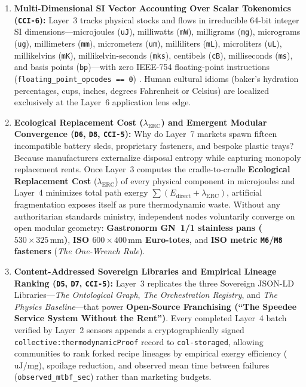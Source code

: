 \begin{enumerate}
    \item \textbf{Multi-Dimensional SI Vector Accounting Over Scalar Tokenomics (\texttt{CCI-6}):} Layer~3 tracks physical stocks and flows in irreducible 64-bit integer SI dimensions---microjoules (\texttt{uJ}), milliwatts (\texttt{mW}), milligrams (\texttt{mg}), micrograms (\texttt{ug}), millimeters (\texttt{mm}), micrometers (\texttt{um}), milliliters (\texttt{mL}), microliters (\texttt{uL}), millikelvins (\texttt{mK}), millikelvin-seconds (\texttt{mks}), centibels (\texttt{cB}), milliseconds (\texttt{ms}), and basis points (\texttt{bp})---with zero IEEE-754 floating-point instructions (\texttt{floating\_point\_opcodes == 0}) \parencite{goldberg1991float}. Human cultural idioms (baker's hydration percentages, cups, inches, degrees Fahrenheit or Celsius) are localized exclusively at the Layer~6 application lens edge.
    \item \textbf{Ecological Replacement Cost ($\lambda_{\mathrm{ERC}}$) and Emergent Modular Convergence (\texttt{D6}, \texttt{D8}, \texttt{CCI-5}):} Why do Layer~7 markets spawn fifteen incompatible battery sleds, proprietary fasteners, and bespoke plastic trays? Because manufacturers externalize disposal entropy while capturing monopoly replacement rents. Once Layer~3 computes the cradle-to-cradle \textbf{Ecological Replacement Cost} ($\lambda_{\mathrm{ERC}}$) of every physical component in microjoules and Layer~4 minimizes total path exergy $\sum (E_{\mathrm{direct}} + \lambda_{\mathrm{ERC}})$, artificial fragmentation exposes itself as pure thermodynamic waste. Without any authoritarian standards ministry, independent nodes voluntarily converge on open modular geometry: \textbf{Gastronorm GN~1/1 stainless pans ($530 \times 325\,\mathrm{mm}$)}, \textbf{ISO $600 \times 400\,\mathrm{mm}$ Euro-totes}, and \textbf{ISO metric \texttt{M6}/\texttt{M8} fasteners} (\textit{The One-Wrench Rule}).
    \item \textbf{Content-Addressed Sovereign Libraries and Empirical Lineage Ranking (\texttt{D5}, \texttt{D7}, \texttt{CCI-5}):} Layer~3 replicates the three Sovereign JSON-LD Libraries---\textit{The Ontological Graph}, \textit{The Orchestration Registry}, and \textit{The Physics Baseline}---that power \textbf{Open-Source Franchising (``The Speedee Service System Without the Rent'')}. Every completed Layer~4 batch verified by Layer~2 sensors appends a cryptographically signed \texttt{collective:thermodynamicProof} record to \texttt{col-storaged}, allowing communities to rank forked recipe lineages by empirical exergy efficiency ($\mathrm{uJ/mg}$), spoilage reduction, and observed mean time between failures (\texttt{observed\_mtbf\_sec}) rather than marketing budgets.

\end{enumerate}
